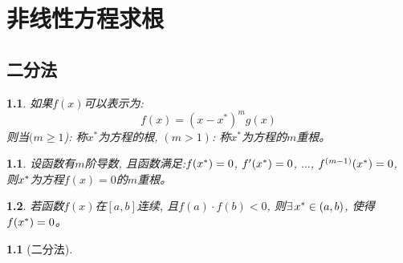 \chapter{非线性方程求根}
\newtheorem{divide_algorithm}{\algo}[chapter]
\newtheorem{iterative_algorithm}[divide_algorithm]{\algo}
\newtheorem{newton_algorithm}[divide_algorithm]{\algo}
\newtheorem{chord_method_algorithm}[divide_algorithm]{\algo}

\section{二分法}
\newtheorem{multi_root}{}[section]
\newtheorem{multi_root_derivative}{\theo}[section]
\newtheorem{mean_theorem}[multi_root_derivative]{\theo}

\begin{multi_root}
    \label{definition:multi_root}
    如果$f(x)$可以表示为:
    \begin{equation}
        f(x) = (x - x^\ast)^mg(x)
    \end{equation}
    则当$(m \ge 1$): 称$x^\ast$为方程的根, $(m > 1)$: 称$x^\ast$为方程的$m$重根。
\end{multi_root}

\medskip

\begin{multi_root_derivative}
    \label{theorem:multi_root_with_derivative}
    设函数有$m$阶导数, 且函数满足:$f(x^\ast)=0$, $f^\prime(x^\ast)=0$, $\ldots$, $f^{(m-1)}(x^\ast) = 0$, 
    则$x^\ast$为方程$f(x)=0$的$m$重根。
\end{multi_root_derivative}

\medskip

\begin{mean_theorem}
    \label{theorem:mean_theorem}
    若函数$f(x)$在$[a, b]$连续, 且$f(a)\cdot f(b)<0$, 则$\exists\,x^\ast\in(a, b)$, 使得$f(x^\ast)=0$。
\end{mean_theorem}

\medskip

\begin{divide_algorithm}[二分法]
    \label{algorithm:divide_algorithm}
    \hfill\break{}
\end{divide_algorithm}

